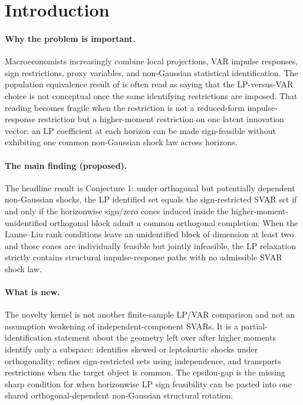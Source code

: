\documentclass[11pt]{article}
\theoremstyle{definition}
\theoremstyle{plain}
\theoremstyle{remark}
\begin{document}
\section{Introduction}
\paragraph{Why the problem is important.}
Macroeconomists increasingly combine local projections, VAR impulse responses, sign restrictions, proxy variables, and non-Gaussian statistical identification.  The population equivalence result of \citet{PlagborgMollerWolf2021} is often read as saying that the LP-versus-VAR choice is not conceptual once the same identifying restrictions are imposed.  That reading becomes fragile when the restriction is not a reduced-form impulse-response restriction but a higher-moment restriction on one latent innovation vector: an LP coefficient at each horizon can be made sign-feasible without exhibiting one common non-Gaussian shock law across horizons.

\paragraph{The main finding (proposed).}
The headline result is Conjecture 1: under orthogonal but potentially dependent non-Gaussian shocks, the LP identified set equals the sign-restricted SVAR set if and only if the horizonwise sign/zero cones induced inside the higher-moment-unidentified orthogonal block admit a common orthogonal completion.  When the Lanne--Liu rank conditions leave an unidentified block of dimension at least two and those cones are individually feasible but jointly infeasible, the LP relaxation strictly contains structural impulse-response paths with no admissible SVAR shock law.

\paragraph{What is new.}
The novelty kernel is not another finite-sample LP/VAR comparison and not an assumption weakening of independent-component SVARs.  It is a partial-identification statement about the geometry left over after higher moments identify only a subspace: \citet{LanneLiu2026} identifies skewed or leptokurtic shocks under orthogonality, \citet{DrautzburgWright2023} refines sign-restricted sets using independence, and \citet{PlagborgMollerWolf2021} transports restrictions when the target object is common.  The epsilon-gap is the missing sharp condition for when horizonwise LP sign feasibility can be pasted into one shared orthogonal-dependent non-Gaussian structural rotation.
\end{document}
